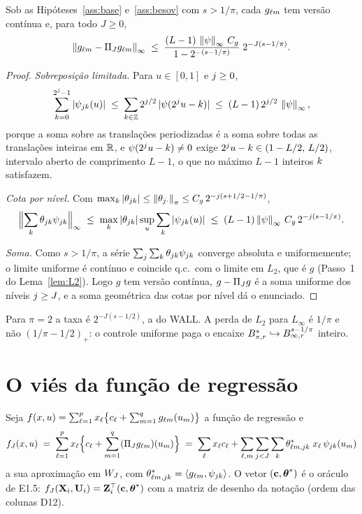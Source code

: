\documentclass[11pt,a4paper]{article}
\begin{document}
\begin{lemma}\label{lem:sup}
Sob as Hipóteses~\ref{ass:base} e~\ref{ass:besov} com $s > 1/\pi$, cada
$g_{\ell m}$ tem versão contínua e, para todo $J \ge 0$,
\[
  \left\lVert g_{\ell m} - \Pi_{J}g_{\ell m} \right\rVert_{\infty}
  \;\le\; \frac{(L-1)\,\left\lVert \psi \right\rVert_{\infty}\,C_{g}}{1 - 2^{-(s - 1/\pi)}}\;
  2^{-J(s - 1/\pi)} .
\]
\end{lemma}

\begin{proof}
\emph{Sobreposição limitada.} Para $u \in [0,1]$ e $j \ge 0$,
\[
  \sum_{k=0}^{2^{j}-1}|\psi_{jk}(u)|
  \;\le\; \sum_{k\in\mathbb{Z}} 2^{j/2}\,|\psi(2^{j}u - k)|
  \;\le\; (L-1)\,2^{j/2}\,\left\lVert \psi \right\rVert_{\infty},
\]
porque a soma sobre as translações periodizadas é a soma sobre todas as
translações inteiras em $\mathbb{R}$, e $\psi(2^{j}u - k) \ne 0$ exige
$2^{j}u - k \in (1 - L/2,\, L/2)$, intervalo aberto de comprimento
$L-1$, o que no máximo $L - 1$ inteiros $k$
satisfazem.

\emph{Cota por nível.} Com $\max_{k}|\theta_{jk}| \le
\left\lVert \theta_{j\cdot} \right\rVert_{\pi} \le C_{g}\,2^{-j(s + 1/2 - 1/\pi)}$,
\[
  \Bigl\lVert \sum_{k}\theta_{jk}\psi_{jk}\Bigr\rVert_{\infty}
  \;\le\; \max_{k}|\theta_{jk}| \sup_{u}\sum_{k}|\psi_{jk}(u)|
  \;\le\; (L-1)\left\lVert \psi \right\rVert_{\infty}\,C_{g}\,2^{-j(s - 1/\pi)} .
\]

\emph{Soma.} Como $s > 1/\pi$, a série $\sum_{j}\sum_{k}\theta_{jk}
\psi_{jk}$ converge absoluta e uniformemente; o limite uniforme é
contínuo e coincide q.c.\ com o limite em $L_{2}$, que é $g$ (Passo~1 do
Lema~\ref{lem:L2}). Logo $g$ tem versão contínua, $g - \Pi_{J} g$ é a soma
uniforme dos níveis $j \ge J$, e a soma geométrica das cotas por nível dá o
enunciado.
\end{proof}

Para $\pi = 2$ a taxa é $2^{-J(s - 1/2)}$, a do WALL. A perda de $L_{2}$ para
$L_{\infty}$ é $1/\pi$ e não $(1/\pi - 1/2)_{+}$: o controle uniforme paga
o encaixe $B^{s}_{\pi,r} \hookrightarrow B^{s - 1/\pi}_{\infty,r}$
inteiro.

\section{O viés da função de regressão}

Seja $f(x,u) = \sum_{\ell=1}^{p} x_{\ell}\bigl\{c_{\ell} +
\sum_{m=1}^{q}g_{\ell m}(u_{m})\bigr\}$ a função de regressão e
\[
  f_{J}(x,u) \;=\; \sum_{\ell=1}^{p} x_{\ell}\Bigl\{c_{\ell} +
  \sum_{m=1}^{q}(\Pi_{J}g_{\ell m})(u_{m})\Bigr\}
  \;=\; \sum_{\ell} x_{\ell}c_{\ell} + \sum_{\ell,m}\sum_{j<J}\sum_{k}
  \theta^{*}_{\ell m,jk}\; x_{\ell}\,\psi_{jk}(u_{m})
\]
a sua aproximação em $W_{J}$, com $\theta^{*}_{\ell m,jk} =
\langle g_{\ell m}, \psi_{jk} \rangle$. O vetor $(\mathbf{c}, \boldsymbol{\theta}^{*})$ é
o oráculo de E1.5: $f_{J}(\mathbf{X}_{i},\mathbf{U}_{i}) = \mathbf{Z}_{i}^{\top}(\mathbf{c},\boldsymbol{\theta}^{*})$
com a matriz de desenho da notação (ordem das colunas D12).
\end{document}
